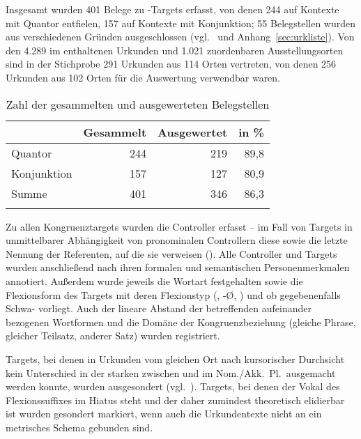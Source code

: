 \label{phsec:caohiatus}
Insgesamt wurden 401 Belege zu -Targets erfasst, von denen 244 auf
Kontexte mit Quantor entfielen, 157 auf Kontexte mit Konjunktion; 55
Belegstellen wurden aus verschiedenen Gründen ausgeschlossen
(vgl.~ und Anhang~\ref{sec:urkliste}). Von den 4.289 im
\CAO{} enthaltenen Urkunden und 1.021 zuordenbaren Ausstellungsorten sind in
der Stichprobe 291 Urkunden aus 114 Orten vertreten, von denen 256 Urkunden aus
102 Orten für die Auswertung verwendbar waren.

\begin{table}
\centering
\caption{Zahl der gesammelten und ausgewerteten Belegstellen}
\begin{tabular}{l r r r}
\lsptoprule

%
	& Gesammelt
	& Ausgewertet
	& in \%
	\\

\midrule


Quantor
	& 244 %
	& 219 %
	& 89,8 %
	\\

Konjunktion
	& 157 %
	& 127 %
	& 80,9 %
	\\

\midrule

Summe
	& 401 %
	& 346 %
	& 86,3 %
	\\

\lspbottomrule
\end{tabular}
\label{tab:ausgewcao}
\end{table}

Zu allen Kongruenztargets wurden die Controller erfasst -- im Fall von Targets
in unmittelbarer Abhängigkeit von pronominalen Controllern diese sowie die
letzte Nennung der Referenten, auf die sie verweisen
(). Alle Controller und Targets wurden anschließend nach
ihren formalen und semantischen Personenmerkmalen annotiert. Außerdem wurde
jeweils die Wortart festgehalten sowie die Flexionsform des Targets mit deren
Flexionstyp (, -Ø, ) und ob gegebenenfalls
Schwa- vorliegt. Auch der lineare Abstand der betreffenden
aufeinander bezogenen Wortformen und die Domäne der Kongruenzbeziehung (gleiche
Phrase, gleicher Teilsatz, anderer Satz) wurden registriert.

Targets, bei denen in Urkunden vom gleichen Ort nach kursorischer Durchsicht
kein Unterschied in der starken  zwischen 
und  im Nom./Akk.~Pl.\ ausgemacht werden konnte, wurden ausgesondert
(vgl.~). Targets, bei denen der Vokal des
Flexionssuffixes im Hiatus steht und der daher zumindest theoretisch elidierbar
ist \autocites[vgl.][90--91]{askedal1973}[191]{gjelsten1980} wurden gesondert
markiert, wenn auch die Urkundentexte nicht an ein metrisches Schema gebunden
sind.

